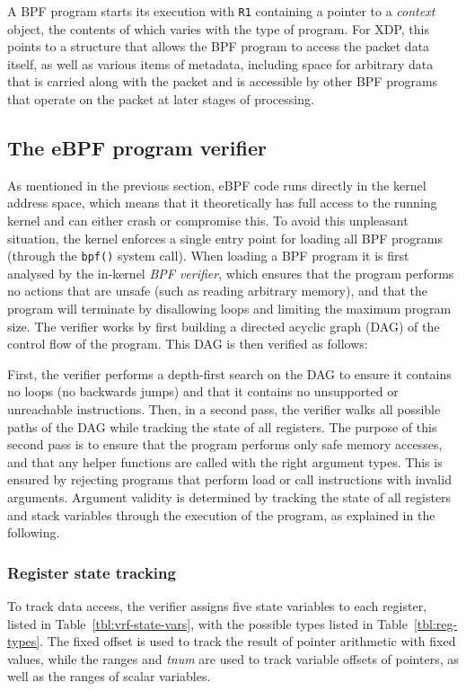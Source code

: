 \documentclass[10pt]{sig-alternate-05-2015}
\begin{document}
A BPF program starts its execution with \texttt{R1} containing a pointer to a \emph{context}
object, the contents of which varies with the type of program. For XDP, this
points to a structure that allows the BPF program to access the packet data
itself, as well as various items of metadata, including space for arbitrary data
that is carried along with the packet and is accessible by other BPF programs
that operate on the packet at later stages of processing.


\subsection{The eBPF program verifier}
\label{sec:bpf-verifier}
As mentioned in the previous section, eBPF code runs directly in the kernel
address space, which means that it theoretically has full access to the running
kernel and can either crash or compromise this. To avoid this unpleasant
situation, the kernel enforces a single entry point for loading all BPF programs
(through the \texttt{bpf()} system call). When loading a BPF program it is first
analysed by the in-kernel \emph{BPF verifier}, which ensures that the program
performs no actions that are unsafe (such as reading arbitrary memory), and that
the program will terminate by disallowing loops and limiting the maximum program
size. The verifier works by first building a directed acyclic graph (DAG) of the
control flow of the program. This DAG is then verified as follows:

First, the verifier performs a depth-first search on the DAG to ensure it
contains no loops (no backwards jumps) and that it contains no unsupported or
unreachable instructions. Then, in a second pass, the verifier walks all
possible paths of the DAG while tracking the state of all registers. The purpose
of this second pass is to ensure that the program performs only safe memory
accesses, and that any helper functions are called with the right argument
types. This is ensured by rejecting programs that perform load or call
instructions with invalid arguments. Argument validity is determined by tracking
the state of all registers and stack variables through the execution of the
program, as explained in the following.

\subsubsection{Register state tracking}
\label{sec:reg-state}
To track data access, the verifier assigns five state variables to each
register, listed in Table \ref{tbl:vrf-state-vars}, with the possible types listed in
Table \ref{tbl:reg-types}. The fixed offset is used to track the result of pointer
arithmetic with fixed values, while the ranges and \emph{tnum} are used to track
variable offsets of pointers, as well as the ranges of scalar variables.
\end{document}
